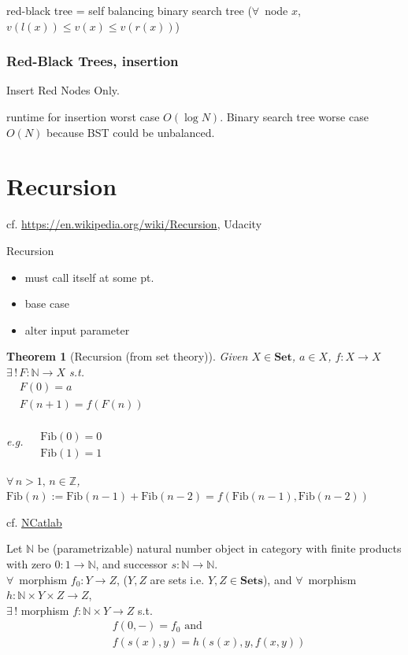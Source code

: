 \documentclass[10pt]{amsart}
\newtheorem{theorem}{Theorem}
\begin{document}
red-black tree = self balancing binary search tree ($\forall \, $ node $x$, $v(l(x)) \leq v(x) \leq v(r(x))$)

\subsubsection{Red-Black Trees, insertion}

Insert Red Nodes Only. 

runtime for insertion worst case $O(\log{N})$. Binary search tree worse case $O(N)$ because BST could be unbalanced. 




\section{Recursion}

cf. \url{https://en.wikipedia.org/wiki/Recursion},  Udacity 

Recursion
\begin{itemize}
	\item must call itself at some pt.
	\item base case
	\item alter input parameter
\end{itemize}

\begin{theorem}[Recursion (from set theory)]
	Given $X \in \textbf{Set}$, $a\in X$, $f:X \to X$ \\
	$\exists \, ! \, F: \mathbb{N} \to X$ s.t. \\
	$\begin{aligned}
	& F(0) = a \\
	& F(n+1) = f(F(n))
	\end{aligned}$
	
	e.g. $\begin{aligned} & \quad \\ 
	& \text{Fib}(0) = 0  \\
	& \text{Fib}(1) = 1 \end{aligned}$ 
	
	$\forall \, n > 1, \, n \in \mathbb{Z}$, $\text{Fib}(n) := \text{Fib}(n-1) + \text{Fib}(n-2) = f(\text{Fib}(n-1), \text{Fib}(n-2))$
\end{theorem} 

cf. \href{https://ncatlab.org/nlab/show/recursion}{NCatlab}

Let $\mathbb{N}$ be (parametrizable) natural number object in category with finite products with zero $0 : 1 \to \mathbb{N}$, and successor $s: \mathbb{N} \to \mathbb{N}$. \\
$\forall \, $ morphism $f_0 : Y \to Z$, ($Y, Z$ are sets i.e. $Y,Z \in \textbf{Sets}$), and $\forall \, $ morphism $h: \mathbb{N} \times Y \times Z \to Z$, \\
$\exists \, !$ morphism $f: \mathbb{N} \times Y \to Z$ s.t.
\begin{equation}
\begin{aligned} 
& f(0, -) = f_0 \text{ and } \\
& f(s(x), y) = h(s(x), y, f(x,y))
\end{aligned}
\end{equation}
\end{document}
